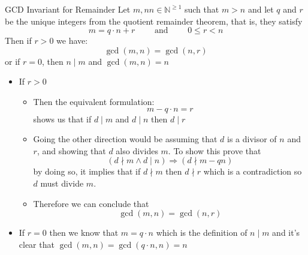 \documentclass{standalone}
\begin{document}
\begin{deduction*}{GCD Invariant for Remainder}
  Let $ m,nn \in \mathbb{N} ^{\ge 1}$ such that $ m > n$ and let $ q$ and $ r$ be the unique integers from the quotient remainder theorem, that is, they satisfy
  \[
    m =  q  \cdot n  +  r \qquad \text{ and } \qquad 0 \le r < n
  \]
  Then if $ r > 0$ we have:
  \[
  \gcd(m,n) = \gcd(n,r)
  \]
  or if $ r = 0$, then $ n \mid m$ and $ \gcd(m,n)= n$ 
  \begin{pf}
    \begin{itemize}
      \item If $ r > 0$ 
        \begin{itemize}
          \item Then the equivalent formulation:
          \[
          m - q  \cdot n =  r
          \]
          shows us that if $ d \mid m$ and $ d \mid n$ then $ d \mid r$
        \item Going the other direction would be assuming that $ d$ is a divisor of $ n$ and $ r$, and showing that $ d$ also divides $ m$. To show this prove that
          \[
            \left( d \nmid m \land  d \mid n \right) \Rightarrow \left( d \nmid m  - qn \right)
          \]
          by doing so, it implies that if $ d \nmid m$ then $ d \nmid r$ which is a contradiction so $ d$ must divide $ m$. 
        \item Therefore we can conclude that
          \[
            \gcd(m,n) = \gcd(n,r)
          \]
        \end{itemize}
        \item If $ r =  0$ then we know that $ m = q  \cdot n$ which is the definition of $ n \mid m$ and it's clear that $ \gcd(m, n) = \gcd(q  \cdot n, n) =  n$ 
    \end{itemize}
  \end{pf}
\end{deduction*}
\end{document}

